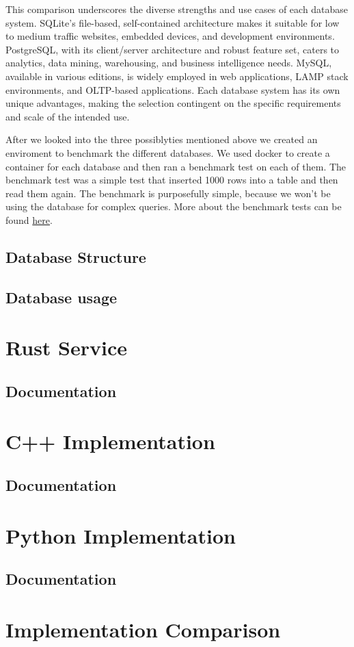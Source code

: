 This comparison underscores the diverse strengths and use cases of each database system. SQLite's file-based, self-contained architecture makes it suitable for 
low to medium traffic websites, embedded devices, and development environments. PostgreSQL, with its client/server architecture and robust feature set, caters 
to analytics, data mining, warehousing, and business intelligence needs. MySQL, available in various editions, is widely employed in web applications, LAMP 
stack environments, and OLTP-based applications. Each database system has its own unique advantages, making the selection contingent on the specific 
requirements and scale of the intended use.\newline

After we looked into the three possiblyties mentioned above we created an enviroment to benchmark the different databases. We used docker to create a container for each 
database and then ran a benchmark test on each of them. The benchmark test was a simple test that inserted 1000 rows into a table and then read them again. The benchmark is
purposefully simple, because we won't be using the database for complex queries. More about the benchmark tests can be found \href{tests.tex}{here}.

\subsection{Database Structure}


\subsection{Database usage}


\section{Rust Service}
\subsection{Documentation}

\section{C++ Implementation}
\subsection{Documentation}

\section{Python Implementation}
\subsection{Documentation}

\section{Implementation Comparison}

\filbreak
